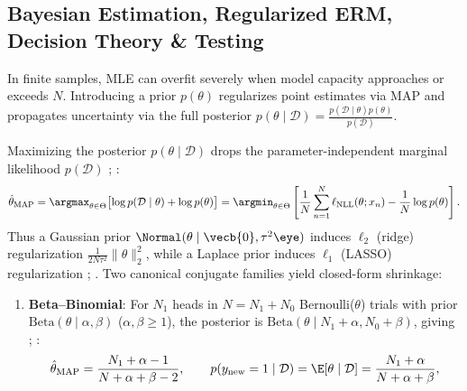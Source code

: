 \documentclass[../../../../master.tex]{subfiles}
\begin{document}
\subsection{Bayesian Estimation, Regularized ERM, Decision Theory \& Testing}
\label{sec:asymp:bayes}

In finite samples, MLE can overfit severely when model capacity approaches or exceeds $N$. Introducing a prior $p(\theta)$ regularizes point estimates via MAP and propagates uncertainty via the full posterior $p(\theta \mid \mathcal{D}) = \frac{p(\mathcal{D}\mid\theta)p(\theta)}{p(\mathcal{D})}$.

\begin{coremath}
Maximizing the posterior $p(\theta \mid \mathcal{D})$ drops the parameter-independent marginal likelihood $p(\mathcal{D})$ ; :
\begin{equation}
\label{eq:asymp:map-erm}
\hat{\theta}_{\mathrm{MAP}} = \argmax_{\theta \in \Theta} \bigl[\log p(\mathcal{D} \mid \theta) + \log p(\theta)\bigr] = \argmin_{\theta \in \Theta} \left[\frac{1}{N}\sum_{n=1}^N \ell_{\mathrm{NLL}}(\theta; x_n) - \frac{1}{N}\log p(\theta)\right].
\end{equation}
Thus a Gaussian prior $\Normal(\theta \mid \vecb{0}, \tau^2 \eye)$ induces $\ell_2$ (ridge) regularization $\frac{1}{2N\tau^2}\|\theta\|_2^2$, while a Laplace prior induces $\ell_1$ (LASSO) regularization ; . Two canonical conjugate families yield closed-form shrinkage:
\begin{enumerate}
  \item \textbf{Beta--Binomial}: For $N_1$ heads in $N = N_1 + N_0$ Bernoulli($\theta$) trials with prior $\mathrm{Beta}(\theta \mid \alpha, \beta)$ ($\alpha,\beta \ge 1$), the posterior is $\mathrm{Beta}(\theta \mid N_1 + \alpha, N_0 + \beta)$, giving ; :
  \begin{equation}
  \hat{\theta}_{\mathrm{MAP}} = \frac{N_1 + \alpha - 1}{N + \alpha + \beta - 2}, \qquad p(y_{\mathrm{new}} = 1 \mid \mathcal{D}) = \E[\theta \mid \mathcal{D}] = \frac{N_1 + \alpha}{N + \alpha + \beta},

\end{equation}
\end{enumerate}
\end{coremath}
\end{document}
